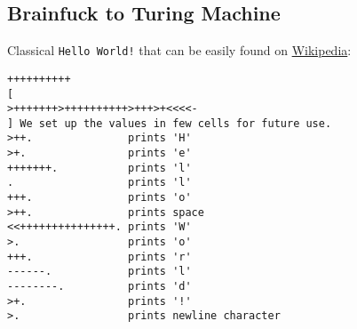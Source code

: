\documentclass[english,shortabstract,mgr]{iithesis}
\begin{document}
\subsection{Brainfuck to Turing Machine}

Classical \texttt{Hello World!} that can be easily found on \href{https://pl.wikipedia.org/wiki/Brainfuck#Przyk%C5%82ady}{Wikipedia}:

\begin{verbatim}
++++++++++
[
>+++++++>++++++++++>+++>+<<<<-
] We set up the values in few cells for future use.
>++.               prints 'H'
>+.                prints 'e'
+++++++.           prints 'l'
.                  prints 'l'
+++.               prints 'o'
>++.               prints space
<<+++++++++++++++. prints 'W'
>.                 prints 'o'
+++.               prints 'r'
------.            prints 'l'
--------.          prints 'd'
>+.                prints '!'
>.                 prints newline character
\end{verbatim}
\end{document}

